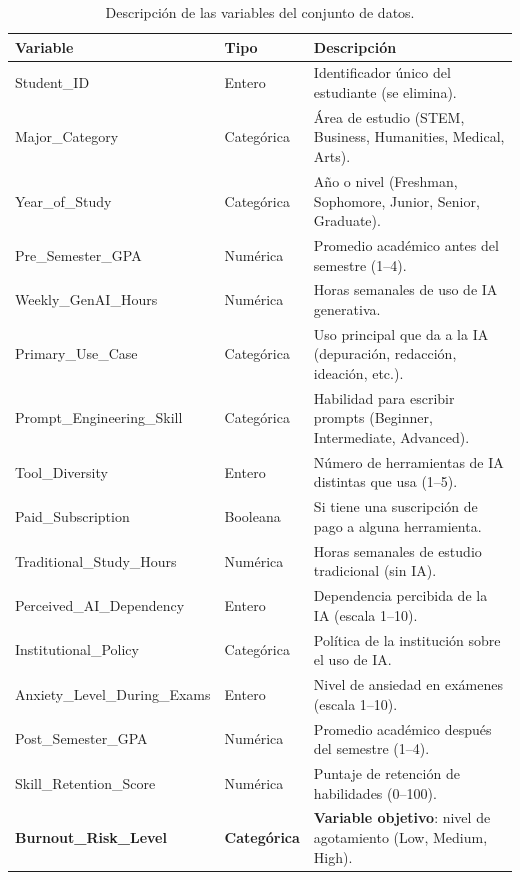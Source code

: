 \documentclass[11pt,letterpaper,twoside]{article}
\begin{document}
\begin{table}[H]
\centering
\caption{Descripción de las variables del conjunto de datos.}
\label{tab:variables}
\small
\begin{tabular}{>{\raggedright}p{4.3cm} p{2.2cm} p{7.5cm}}
\toprule
\textbf{Variable} & \textbf{Tipo} & \textbf{Descripción} \\
\midrule
Student\_ID & Entero & Identificador único del estudiante (se elimina). \\
Major\_Category & Categórica & Área de estudio (STEM, Business, Humanities, Medical, Arts). \\
Year\_of\_Study & Categórica & Año o nivel (Freshman, Sophomore, Junior, Senior, Graduate). \\
Pre\_Semester\_GPA & Numérica & Promedio académico antes del semestre (1--4). \\
Weekly\_GenAI\_Hours & Numérica & Horas semanales de uso de IA generativa. \\
Primary\_Use\_Case & Categórica & Uso principal que da a la IA (depuración, redacción, ideación, etc.). \\
Prompt\_Engineering\_Skill & Categórica & Habilidad para escribir prompts (Beginner, Intermediate, Advanced). \\
Tool\_Diversity & Entero & Número de herramientas de IA distintas que usa (1--5). \\
Paid\_Subscription & Booleana & Si tiene una suscripción de pago a alguna herramienta. \\
Traditional\_Study\_Hours & Numérica & Horas semanales de estudio tradicional (sin IA). \\
Perceived\_AI\_Dependency & Entero & Dependencia percibida de la IA (escala 1--10). \\
Institutional\_Policy & Categórica & Política de la institución sobre el uso de IA. \\
Anxiety\_Level\_During\_Exams & Entero & Nivel de ansiedad en exámenes (escala 1--10). \\
Post\_Semester\_GPA & Numérica & Promedio académico después del semestre (1--4). \\
Skill\_Retention\_Score & Numérica & Puntaje de retención de habilidades (0--100). \\
\textbf{Burnout\_Risk\_Level} & \textbf{Categórica} & \textbf{Variable objetivo}: nivel de agotamiento (Low, Medium, High). \\
\bottomrule
\end{tabular}
\end{table}
\end{document}
